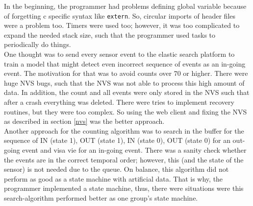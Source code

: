 In the beginning, the programmer had problems defining global variable because of forgetting
c specific syntax like \verb!extern!. So, circular imports of header files were a problem too.
Timers were used too; however, it was too complicated to expand the needed stack size, such that
the programmer used tasks to periodically do things. \\
One thought was to send every sensor event to the elastic search platform to train a model that
might detect even incorrect sequence of events as an in-going event. The motivation for that
was to avoid counts over $70$ or higher. There were huge NVS bugs, such that the
NVS was not able to process this high amount of data. In addition, the count and all events were only
stored in the NVS such that after a crash everything was deleted. There were tries to implement
recovery routines, but they were too complex. So using the web client and fixing the
NVS as described in section \ref{nvs} was the better approach.\\
Another approach for the counting algorithm was to search in the buffer for the sequence of IN (state 1),
OUT (state 1), IN (state 0), OUT (state 0) for an out-going event and visa vie for an in-going event.
There was a sanity check whether the events are in the correct temporal order; however, this (and the state of the
sensor) is not needed due
to the queue. On balance, this algorithm did not perform as good as a state machine with artificial data.
That is why, the programmer implemented a state machine, thus, there were situations were this search-algorithm
performed better as one group's state machine.


